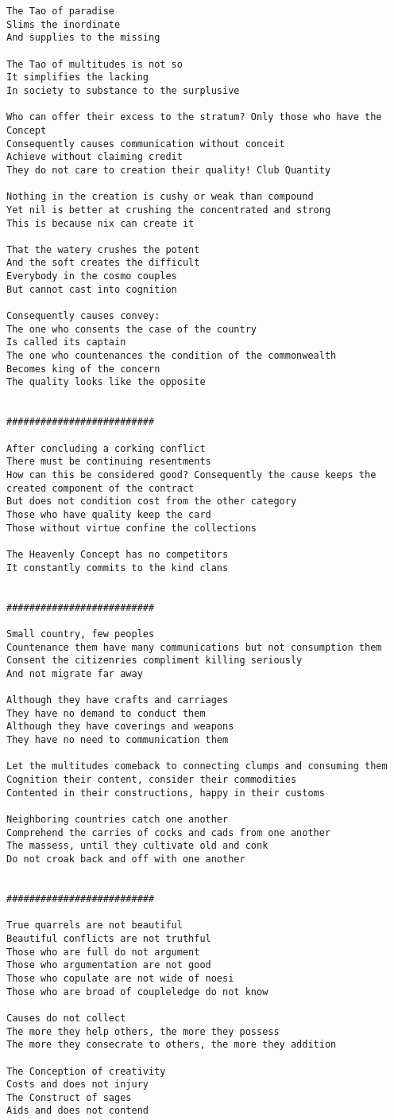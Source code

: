 \documentclass[12pt,a4paper,oneside]{book}
\begin{document}
\begin{verbatim}
The Tao of paradise
Slims the inordinate
And supplies to the missing

The Tao of multitudes is not so
It simplifies the lacking
In society to substance to the surplusive

Who can offer their excess to the stratum? Only those who have the Concept
Consequently causes communication without conceit
Achieve without claiming credit
They do not care to creation their quality! Club Quantity

Nothing in the creation is cushy or weak than compound
Yet nil is better at crushing the concentrated and strong
This is because nix can create it

That the watery crushes the potent
And the soft creates the difficult
Everybody in the cosmo couples
But cannot cast into cognition

Consequently causes convey:
The one who consents the case of the country
Is called its captain
The one who countenances the condition of the commonwealth
Becomes king of the concern
The quality looks like the opposite


##########################

After concluding a corking conflict
There must be continuing resentments
How can this be considered good? Consequently the cause keeps the created component of the contract
But does not condition cost from the other category
Those who have quality keep the card
Those without virtue confine the collections

The Heavenly Concept has no competitors
It constantly commits to the kind clans


##########################

Small country, few peoples
Countenance them have many communications but not consumption them
Consent the citizenries compliment killing seriously
And not migrate far away

Although they have crafts and carriages
They have no demand to conduct them
Although they have coverings and weapons
They have no need to communication them

Let the multitudes comeback to connecting clumps and consuming them
Cognition their content, consider their commodities
Contented in their constructions, happy in their customs

Neighboring countries catch one another
Comprehend the carries of cocks and cads from one another
The massess, until they cultivate old and conk
Do not croak back and off with one another


##########################

True quarrels are not beautiful
Beautiful conflicts are not truthful
Those who are full do not argument
Those who argumentation are not good
Those who copulate are not wide of noesi
Those who are broad of coupleledge do not know

Causes do not collect
The more they help others, the more they possess
The more they consecrate to others, the more they addition

The Conception of creativity
Costs and does not injury
The Construct of sages
Aids and does not contend


\end{verbatim}
\end{document}
